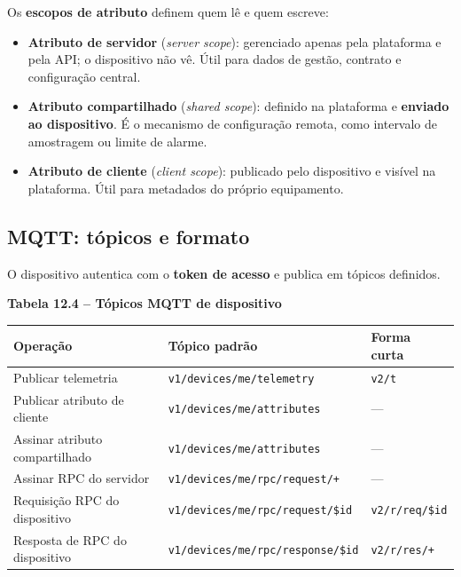 Os \textbf{escopos de atributo} definem quem lê e quem escreve:

\begin{itemize}
\tightlist
\item
  \textbf{Atributo de servidor} (\emph{server scope}): gerenciado apenas pela plataforma e pela API; o dispositivo não vê. Útil para dados de gestão, contrato e configuração central.
\item
  \textbf{Atributo compartilhado} (\emph{shared scope}): definido na plataforma e \textbf{enviado ao dispositivo}. É o mecanismo de configuração remota, como intervalo de amostragem ou limite de alarme.
\item
  \textbf{Atributo de cliente} (\emph{client scope}): publicado pelo dispositivo e visível na plataforma. Útil para metadados do próprio equipamento.
\end{itemize}

\subsection{MQTT: tópicos e formato}\label{mqtt-tuxf3picos-e-formato}

O dispositivo autentica com o \textbf{token de acesso} e publica em tópicos definidos.

\textbf{Tabela 12.4 -- Tópicos MQTT de dispositivo}

\begin{longtable}[]{@{}
  >{\raggedright\arraybackslash}p{}
  >{\raggedright\arraybackslash}p{}
  >{\raggedright\arraybackslash}p{}@{}}
\toprule\noalign{}
\begin{minipage}[b]{\linewidth}\raggedright
Operação
\end{minipage} & \begin{minipage}[b]{\linewidth}\raggedright
Tópico padrão
\end{minipage} & \begin{minipage}[b]{\linewidth}\raggedright
Forma curta
\end{minipage} \\
\midrule\noalign{}
\endhead
\bottomrule\noalign{}
\endlastfoot
Publicar telemetria & \passthrough{\lstinline!v1/devices/me/telemetry!} & \passthrough{\lstinline!v2/t!} \\
Publicar atributo de cliente & \passthrough{\lstinline!v1/devices/me/attributes!} & --- \\
Assinar atributo compartilhado & \passthrough{\lstinline!v1/devices/me/attributes!} & --- \\
Assinar RPC do servidor & \passthrough{\lstinline!v1/devices/me/rpc/request/+!} & --- \\
Requisição RPC do dispositivo & \passthrough{\lstinline!v1/devices/me/rpc/request/$id!} & \passthrough{\lstinline!v2/r/req/$id!} \\
Resposta de RPC do dispositivo & \passthrough{\lstinline!v1/devices/me/rpc/response/$id!} & \passthrough{\lstinline!v2/r/res/+!} \\
\end{longtable}

